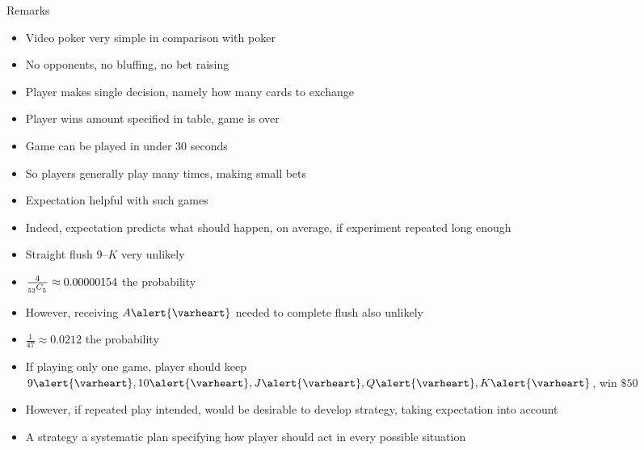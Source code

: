 \documentclass[handout,xcolor=dvipsnames]{beamer}
\theoremstyle{definition}
\newcommand\ncr[2]{\tensor[_{#1}]C{_{#2}}}
\newcommand{\hs}{\alert{\varheart}}
\begin{document}
\begin{frame}{Remarks}
\begin{itemize}
\item Video poker very simple in comparison with poker
\item No opponents, no bluffing, no bet raising 
\item Player makes single decision, namely how many
cards to exchange
\item Player wins amount specified in table, game is over
\item Game can be played in under 30 seconds
\item So players generally play many times, making small bets
\item Expectation helpful with such games
\item Indeed, expectation predicts what should
happen, on average, if 
experiment repeated long enough
\end{itemize}
\end{frame}

\begin{frame}
\begin{itemize}
\item Straight flush $9$--$K$ very unlikely
\item $\frac{4}{\ncr{52}{5}}\approx 0.00000154$ the probability
\item However, receiving $A\hs$ needed to complete flush
also unlikely
\item $\frac{1}{47}\approx 0.0212$ the probability
\item If playing only one game, player should
keep $9\hs,10\hs,J\hs,Q\hs,K\hs$, win $\$50$
\item However, if repeated play intended, would
be desirable to develop \alert{strategy}, taking
expectation into account
\item A \alert{strategy} a systematic plan specifying 
how player should act in every possible situation
\end{itemize}
\end{frame}
\end{document}
